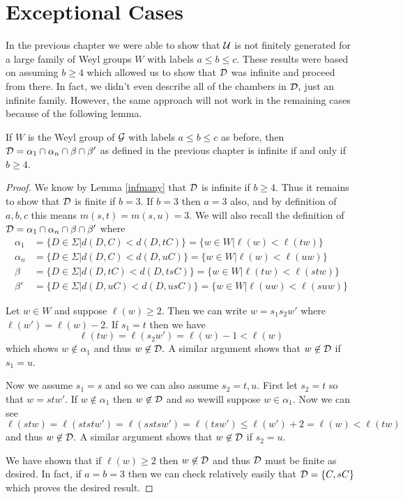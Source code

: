 \documentclass[class=book, crop=false]{standalone}
\begin{document}
\chapter{Exceptional Cases}
In the previous chapter we were able to show that $\mathcal{U}$ is not finitely generated for a large family of Weyl groups $W$ with labels $a\le b\le c.$ These results were based on assuming $b\ge 4$ which allowed us to show that $\mathcal{D}$ was infinite and proceed from there. In fact, we didn't even describe all of the chambers in $\mathcal{D},$ just an infinite family. However, the same approach will not work in the remaining cases because of the following lemma.
\begin{lemma} If $W$ is the Weyl group of $\mathcal{G}$ with labels $a\le b\le c$ as before, then $\mathcal{D}=\alpha_1\cap \alpha_n\cap \beta\cap \beta'$ as defined in the previous chapter is infinite if and only if $b\ge 4.$
	\label{infD}
\end{lemma}
\begin{proof}
	We know by Lemma \ref{infmany} that $\mathcal{D}$ is infinite if $b\ge 4.$ Thus it remains to show that $\mathcal{D}$ is finite if $b=3.$ If $b=3$ then $a=3$ also, and by definition of $a,b,c$ this means $m(s,t)=m(s,u)=3.$ We will also recall the definition of $\mathcal{D}=\alpha_1\cap \alpha_n\cap \beta \cap \beta'$ where
	\begin{align*}
	\alpha_1&=\{D\in \Sigma|d(D,C)<d(D,tC)\}=\{w\in W|\ell(w)<\ell(tw)\}\\
	\alpha_n&=\{D\in \Sigma|d(D,C)<d(D,uC)\}=\{w\in W|\ell(w)<\ell(uw)\}\\
	\beta&=\{D\in \Sigma|d(D,tC)<d(D,tsC)\}=\{w\in W|\ell(tw)<\ell(stw)\}\\
	\beta'&=\{D\in \Sigma|d(D,uC)<d(D,usC)\}=\{w\in W|\ell(uw)<\ell(suw)\}
\end{align*}

Let $w\in W$ and suppose $\ell(w)\ge 2.$ Then we can write $w=s_1s_2w'$ where $\ell(w')=\ell(w)-2.$ If $s_1=t$ then we have
\[
	\ell(tw)=\ell(s_2w')=\ell(w)-1<\ell(w)
\]
which shows $w\not\in \alpha_1$ and thus $w\not\in \mathcal{D}.$ A similar argument shows that $w\not\in \mathcal{D}$ if $s_1=u.$

Now we assume $s_1=s$ and so we can also assume $s_2=t,u.$ First let $s_2=t$ so that $w=stw'.$ If $w\not\in \alpha_1$ then $w\not\in \mathcal{D}$ and so wewill suppose $w\in\alpha_1.$ Now we can see
\[
	\ell(stw)=\ell(ststw')=\ell(sstsw')=\ell(tsw')\le \ell(w')+2=\ell(w)<\ell(tw)
\]
and thus $w\not\in \mathcal{D}.$ A similar argument shows that $w\not\in \mathcal{D}$ if $s_2=u.$

We have shown that if $\ell(w)\ge 2$ then $w\not\in \mathcal{D}$ and thus $\mathcal{D}$ must be finite as desired. In fact, if $a=b=3$ then we can check relatively easily that $\mathcal{D}=\{C,sC\}$ which proves the desired result.
\end{proof}
\end{document}
